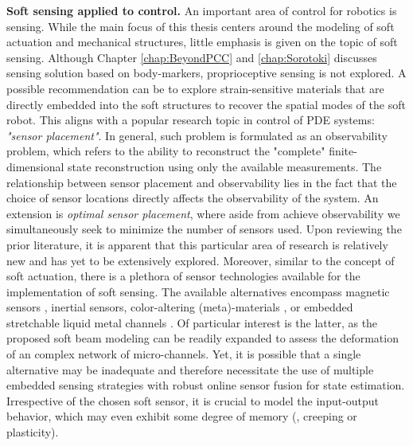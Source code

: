 \textbf{Soft sensing applied to control.} An important area of control for robotics is sensing. While the main focus of this thesis centers around the modeling of soft actuation and mechanical structures, little emphasis is given on the topic of soft sensing. Although Chapter \ref{chap:BeyondPCC} and \ref{chap:Sorotoki} discusses sensing solution based on body-markers, proprioceptive sensing is not explored. A possible recommendation can be to explore strain-sensitive materials that are directly embedded into the soft structures to recover the spatial modes of the soft robot. This aligns with a popular research topic in control of PDE systems: \textit{"sensor placement"}. In general, such problem is formulated as an observability problem, which refers to the ability to reconstruct the "complete" finite-dimensional state reconstruction using only the available measurements. The relationship between sensor placement and observability lies in the fact that the choice of sensor locations directly affects the observability of the system. An extension is \textit{optimal sensor placement}, where aside from achieve observability we simultaneously seek to minimize the number of sensors used. Upon reviewing the prior literature, it is apparent that this particular area of research is relatively new and has yet to be extensively explored. Moreover, similar to the concept of soft actuation, there is a plethora of sensor technologies available for the implementation of soft sensing. The available alternatives encompass magnetic sensors \cite{Felt2015Oct,Felt2019Feb,Baaij2023}, inertial sensors, color-altering (meta)-materials \cite{Scharff2019Jul}, or embedded stretchable liquid metal channels \cite{Park2012,Tapia2020}. Of particular interest is the latter, as the proposed soft beam modeling can be readily expanded to assess the deformation of an complex network of micro-channels. Yet, it is possible that a single alternative may be inadequate and therefore necessitate the use of multiple embedded sensing strategies with robust online sensor fusion for state estimation. Irrespective of the chosen soft sensor, it is crucial to model the input-output behavior, which may even exhibit some degree of memory (\eg, creeping or plasticity).


